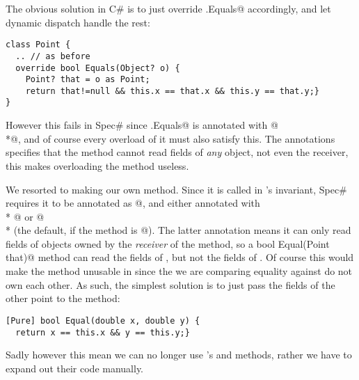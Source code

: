 The obvious solution in C\# is to just override \Q@Object.Equals@ accordingly, and let dynamic dispatch handle the rest:
\begin{lstlisting}
class Point {
  .. // as before
  override bool Equals(Object? o) {
    Point? that = o as Point;
    return that!=null && this.x == that.x && this.y == that.y;}
}
\end{lstlisting}

However this fails in Spec\# since \Q@Object.Equals@ is annotated with \Q@[Pure]@\\*@, and of course every overload of it must also satisfy this. The \Q@Reads@ annotations specifies that the method cannot read fields of \emph{any} object, not even the receiver, this makes overloading the method useless.

We resorted to making our own \Q@Equal@ method. Since it is called in \Q@Cage@'s invariant, Spec\# requires it to be annotated as \Q@[Pure]@, and either annotated with\\* @ or @\\* (the default, if the method is \Q@[Pure]@). The latter annotation means it can only read fields of objects owned by the \emph{receiver} of the method, so a \Q@[Pure] bool Equal(Point that)@ method can read the fields of \Q@this@, but not the fields of \Q@that@. Of course this would make the method unusable in \Q@Cage@ since the \Q@Point@s we are comparing equality against do not own each other. As such, the simplest solution is to just pass the fields of the other point to the method:
\begin{lstlisting}
[Pure] bool Equal(double x, double y) {
  return x == this.x && y == this.y;}
\end{lstlisting}

Sadly however this mean we can no longer use \Q@List@'s \Q@Contains@ and \Q@IndexOf@ methods, rather we have to expand out their code manually.
\lstset{language=FortyTwo}
